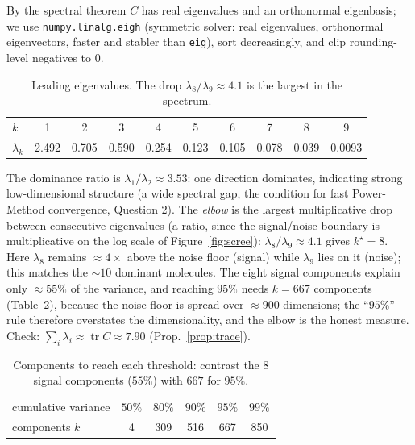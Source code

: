 \documentclass[12pt]{article}
\DeclareMathOperator{\tr}{tr}
\theoremstyle{definition}\newtheorem{definition}{Definition}
\theoremstyle{plain}\newtheorem{proposition}{Proposition}
\begin{document}
By the spectral theorem $C$ has real eigenvalues and an orthonormal eigenbasis; we use
\texttt{numpy.linalg.eigh} (symmetric solver: real eigenvalues, orthonormal eigenvectors, faster and
stabler than \texttt{eig}), sort decreasingly, and clip rounding-level negatives to $0$.

\begin{table}[h]\centering\small
\begin{tabular}{lccccccccc}
\toprule
$k$ & 1 & 2 & 3 & 4 & 5 & 6 & 7 & 8 & 9\\
$\lambda_k$ & 2.492 & 0.705 & 0.590 & 0.254 & 0.123 & 0.105 & 0.078 & 0.039 & 0.0093\\
\bottomrule
\end{tabular}
\caption{Leading eigenvalues. The drop $\lambda_8/\lambda_9\approx4.1$ is the largest in the spectrum.}
\label{tab:eig}
\end{table}

The dominance ratio is $\lambda_1/\lambda_2\approx3.53$: one direction dominates, indicating strong
low-dimensional structure (a wide spectral gap, the condition for fast Power-Method convergence,
Question 2). The \emph{elbow} is the largest multiplicative drop between consecutive eigenvalues
(a ratio, since the signal/noise boundary is multiplicative on the log scale of
Figure~\ref{fig:scree}): $\lambda_8/\lambda_9\approx4.1$ gives $k^\star=8$. Here $\lambda_8$ remains
$\approx4\times$ above the noise floor (signal) while $\lambda_9$ lies on it (noise); this matches the
$\sim10$ dominant molecules. The eight signal components explain only $\approx55\%$ of the variance,
and reaching $95\%$ needs $k=667$ components (Table~\ref{tab:cum}), because the noise floor is spread
over $\approx900$ dimensions; the ``$95\%$'' rule therefore overstates the dimensionality, and the
elbow is the honest measure. Check: $\sum_i\lambda_i\approx\tr C\approx7.90$ (Prop.~\ref{prop:trace}).

\begin{table}[h]\centering\small
\begin{tabular}{lccccc}
\toprule
cumulative variance & $50\%$ & $80\%$ & $90\%$ & $95\%$ & $99\%$\\
components $k$ & 4 & 309 & 516 & 667 & 850\\
\bottomrule
\end{tabular}
\caption{Components to reach each threshold: contrast the $8$ signal components ($55\%$) with $667$ for $95\%$.}
\label{tab:cum}
\end{table}
\end{document}
